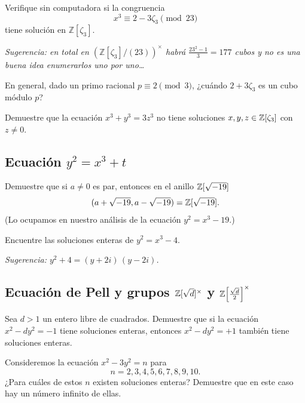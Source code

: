 \begin{ejercicio}
  Verifique sin computadora si la congruencia
  $$x^3 \equiv 2 - 3\zeta_3 \pmod{23}$$
  tiene solución en $\mathbb{Z} [\zeta_3]$.

  \emph{Sugerencia: en total en $(\mathbb{Z} [\zeta_3]/(23))^\times$ habrá
    $\frac{23^2 - 1}{3} = 177$ cubos y no es una buena idea enumerarlos uno por
    uno\dots}

  En general, dado un primo racional $p \equiv 2 \pmod{3}$, ¿cuándo $2 +
  3\zeta_3$ es un cubo módulo $p$?
\end{ejercicio}

\begin{ejercicio}
  Demuestre que la ecuación $x^3 + y^3 = 3z^3$ no tiene soluciones
  $x,y,z \in \mathbb{Z} [\zeta_3]$ con $z\ne 0$.
\end{ejercicio}

\subsection*{Ecuación $y^2 = x^3 + t$}

\begin{ejercicio}
  Demuestre que si $a \ne 0$ es par, entonces en el anillo $\mathbb{Z} [\sqrt{-19}]$
  $$(a + \sqrt{-19}, a - \sqrt{-19}) = \mathbb{Z} [\sqrt{-19}].$$
  (Lo ocupamos en nuestro análisis de la ecuación $y^2 = x^3 - 19$.)
\end{ejercicio}

\begin{ejercicio}
  Encuentre las soluciones enteras de $y^2 = x^3 - 4$.

  \emph{Sugerencia: $y^2 + 4 = (y + 2i)\,(y - 2i)$.}
\end{ejercicio}

\subsection*{Ecuación de Pell y grupos $\mathbb{Z} [\sqrt{d}]^\times$ y $\mathbb{Z} \Bigl[\frac{\sqrt{d}}{2}\Bigr]^\times$}

\begin{ejercicio}
  Sea $d > 1$ un entero libre de cuadrados. Demuestre que si la ecuación
  $x^2 - dy^2 = -1$ tiene soluciones enteras, entonces $x^2 - dy^2 = +1$
  también tiene soluciones enteras.
\end{ejercicio}

\begin{ejercicio}
  Consideremos la ecuación $x^2 - 3y^2 = n$ para
  $$n = 2,3,4,5,6,7,8,9,10.$$
  ¿Para cuáles de estos $n$ existen soluciones enteras? Demuestre que en este
  caso hay un número infinito de ellas.
\end{ejercicio}

